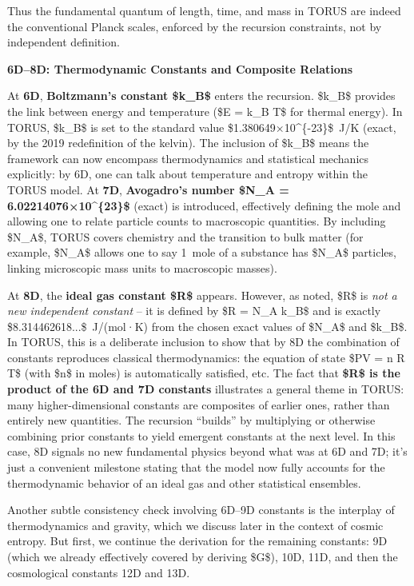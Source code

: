 \documentclass[]{article}
\begin{document}
Thus the fundamental quantum of length, time, and mass in TORUS are
indeed the conventional Planck scales, enforced by the recursion
constraints, not by independent definition.

\textbf{6D--8D: Thermodynamic Constants and Composite Relations}

At \textbf{6D}, \textbf{Boltzmann's constant \$k\_B\$} enters the
recursion. \$k\_B\$ provides the link between energy and temperature
(\$E = k\_B T\$ for thermal energy). In TORUS, \$k\_B\$ is set to the
standard value \$1.380649×10\^{}\{-23\}\$~J/K (exact, by the 2019
redefinition of the kelvin). The inclusion of \$k\_B\$ means the
framework can now encompass thermodynamics and statistical mechanics
explicitly: by 6D, one can talk about temperature and entropy within the
TORUS model. At \textbf{7D}, \textbf{Avogadro's number \$N\_A =
6.02214076×10\^{}\{23\}\$} (exact) is introduced, effectively defining
the mole and allowing one to relate particle counts to macroscopic
quantities. By including \$N\_A\$, TORUS covers chemistry and the
transition to bulk matter (for example, \$N\_A\$ allows one to say
1~mole of a substance has \$N\_A\$ particles, linking microscopic mass
units to macroscopic masses).

At \textbf{8D}, the \textbf{ideal gas constant \$R\$} appears. However,
as noted, \$R\$ is \emph{not a new independent constant} -- it is
defined by \$R = N\_A k\_B\$ and is exactly \$8.314462618...\$~J/(mol·K)
from the chosen exact values of \$N\_A\$ and \$k\_B\$​. In TORUS, this
is a deliberate inclusion to show that by 8D the combination of
constants reproduces classical thermodynamics: the equation of state
\$PV = n R T\$ (with \$n\$ in moles) is automatically satisfied, etc.
The fact that \textbf{\$R\$ is the product of the 6D and 7D constants}
illustrates a general theme in TORUS: many higher-dimensional constants
are composites of earlier ones, rather than entirely new quantities​.
The recursion ``builds'' by multiplying or otherwise combining prior
constants to yield emergent constants at the next level. In this case,
8D signals no new fundamental physics beyond what was at 6D and 7D; it's
just a convenient milestone stating that the model now fully accounts
for the thermodynamic behavior of an ideal gas and other statistical
ensembles.

Another subtle consistency check involving 6D--9D constants is the
interplay of thermodynamics and gravity, which we discuss later in the
context of cosmic entropy. But first, we continue the derivation for the
remaining constants: 9D (which we already effectively covered by
deriving \$G\$), 10D, 11D, and then the cosmological constants 12D and
13D.
\end{document}
